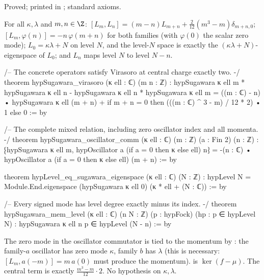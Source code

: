 \begin{status}
Proved; printed in ; standard axioms.
\end{status}

\begin{theorem}[Virasoro with $c=2$; oscillator commutators; degree]\label{ch17:thm:hypvirasoro}
For all $\kappa,\lambda$ and $m,n\in\Z$:
$[L_m,L_n]=(m-n)L_{m+n}+\tfrac{2}{12}(m^3-m)\delta_{m+n,0}$; $[L_m,\varphi(n)]=-n\,\varphi(m+n)$ for both families (with
$\varphi(0)$ the scalar zero mode); $L_0=\kappa\lambda+N$ on level $N$, and the level-$N$ space is exactly the
$(\kappa\lambda+N)$-eigenspace of $L_0$; and $L_n$ maps level $N$ to level $N-n$.
\end{theorem}

\begin{leancode}
/-- The concrete operators satisfy Virasoro at central charge exactly two. -/
theorem hypSugawara_virasoro (κ ell : ℂ) (m n : ℤ) :
    hypSugawara κ ell m * hypSugawara κ ell n -
      hypSugawara κ ell n * hypSugawara κ ell m =
      ((m : ℂ) - n) • hypSugawara κ ell (m + n) +
        if m + n = 0 then (((m : ℂ) ^ 3 - m) / 12 * 2) • 1 else 0 := by

/-- The complete mixed relation, including zero oscillator index and all momenta. -/
theorem hypSugawara_oscillator_comm (κ ell : ℂ) (m : ℤ) (a : Fin 2) (n : ℤ) :
    ⁅hypSugawara κ ell m, hypOscillator a (if a = 0 then κ else ell) n⁆ =
      -(n : ℂ) • hypOscillator a (if a = 0 then κ else ell) (m + n) := by

theorem hypLevel_eq_sugawara_eigenspace (κ ell : ℂ) (N : ℤ) :
    hypLevel N = Module.End.eigenspace (hypSugawara κ ell 0) (κ * ell + (N : ℂ)) := by

/-- Every signed mode has level degree exactly minus its index. -/
theorem hypSugawara_mem_level (κ ell : ℂ) (n N : ℤ) (p : hypFock)
    (hp : p ∈ hypLevel N) : hypSugawara κ ell n p ∈ hypLevel (N - n) := by
\end{leancode}

\begin{dictionary}
The zero mode in the oscillator commutator is tied to the momentum by : the
family-$a$ oscillator has zero mode $\kappa$, family $b$ has $\lambda$ (this is necessary: $[L_m,a(-m)]=m\,a(0)$ must
produce the momentum).   is $\ker(f-\mu)$.  The central term is exactly
$\frac{m^3-m}{12}\cdot2$.  No hypothesis on $\kappa,\lambda$.
\end{dictionary}

